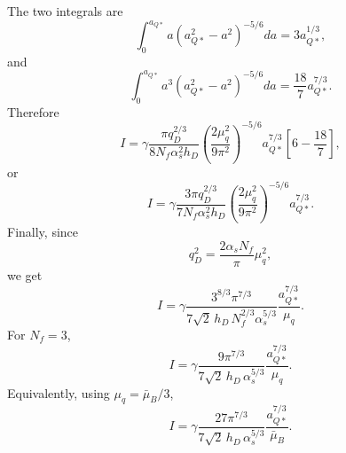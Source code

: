 The two integrals are
\begin{equation}
\int_0^{a_{Q*}}a
\left(a_{Q*}^2-a^2\right)^{-5/6}da
=
3a_{Q*}^{1/3},
\end{equation}
and
\begin{equation}
\int_0^{a_{Q*}}a^3
\left(a_{Q*}^2-a^2\right)^{-5/6}da
=
\frac{18}{7}a_{Q*}^{7/3}.
\end{equation}
Therefore
\begin{equation}
I
=
\gamma
\frac{\pi q_D^{2/3}}{8N_f\alpha_s^2h_D}
\left(\frac{2\mu_q^2}{9\pi^2}\right)^{-5/6}
a_{Q*}^{7/3}
\left[
6-\frac{18}{7}
\right],
\end{equation}
or
\begin{equation}
I
=
\gamma
\frac{3\pi q_D^{2/3}}{7N_f\alpha_s^2h_D}
\left(\frac{2\mu_q^2}{9\pi^2}\right)^{-5/6}
a_{Q*}^{7/3}.
\end{equation}
Finally, since
\begin{equation}
q_D^2=\frac{2\alpha_sN_f}{\pi}\mu_q^2,
\end{equation}
we get
\begin{equation}
I
=
\gamma
\frac{
3^{8/3}\pi^{7/3}
}{
7\sqrt{2}\,h_D\,N_f^{2/3}\alpha_s^{5/3}
}
\frac{a_{Q*}^{7/3}}{\mu_q}.
\end{equation}
For \(N_f=3\),
\begin{equation}
I
=
\gamma
\frac{
9\pi^{7/3}
}{
7\sqrt{2}\,h_D\,\alpha_s^{5/3}
}
\frac{a_{Q*}^{7/3}}{\mu_q}.
\end{equation}
Equivalently, using \(\mu_q=\bar\mu_B/3\),
\begin{equation}
I
=
\gamma
\frac{
27\pi^{7/3}
}{
7\sqrt{2}\,h_D\,\alpha_s^{5/3}
}
\frac{a_{Q*}^{7/3}}{\bar\mu_B}.
\end{equation}

